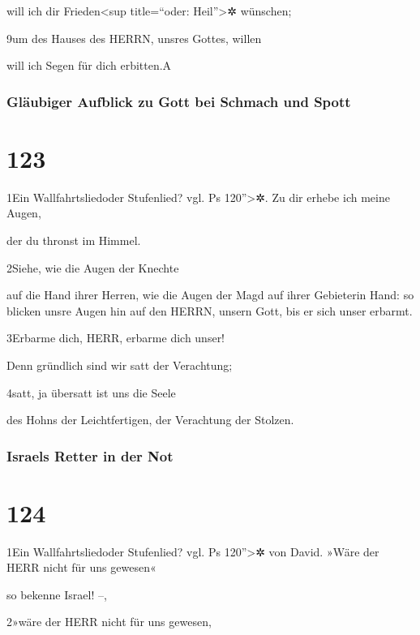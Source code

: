 will ich dir Frieden\textless sup title=``oder: Heil''\textgreater✲
wünschen;

9um des Hauses des HERRN, unsres Gottes, willen

will ich Segen für dich erbitten.{A}

\hypertarget{gluxe4ubiger-aufblick-zu-gott-bei-schmach-und-spott}{%
\subsubsection{Gläubiger Aufblick zu Gott bei Schmach und
Spott}\label{gluxe4ubiger-aufblick-zu-gott-bei-schmach-und-spott}}

\hypertarget{section-122}{%
\section{123}\label{section-122}}

1Ein Wallfahrtsliedoder Stufenlied? vgl. Ps 120''\textgreater✲. Zu dir
erhebe ich meine Augen,

der du thronst im Himmel.

2Siehe, wie die Augen der Knechte

auf die Hand ihrer Herren, wie die Augen der Magd auf ihrer Gebieterin
Hand: so blicken unsre Augen hin auf den HERRN, unsern Gott, bis er sich
unser erbarmt.

3Erbarme dich, HERR, erbarme dich unser!

Denn gründlich sind wir satt der Verachtung;

4satt, ja übersatt ist uns die Seele

des Hohns der Leichtfertigen, der Verachtung der Stolzen.

\hypertarget{israels-retter-in-der-not}{%
\subsubsection{Israels Retter in der
Not}\label{israels-retter-in-der-not}}

\hypertarget{section-123}{%
\section{124}\label{section-123}}

1Ein Wallfahrtsliedoder Stufenlied? vgl. Ps 120''\textgreater✲ von
David. »Wäre der HERR nicht für uns gewesen«

so bekenne Israel! --,

2»wäre der HERR nicht für uns gewesen,

